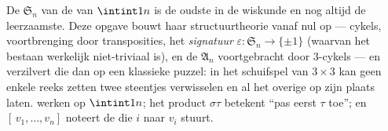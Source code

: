 \begin{problem}\label{pb:b1:structures:1}
De  $\mathfrak S_n$ van de  van $\intint1n$ is de oudste
 in de wiskunde en nog altijd de leerzaamste. Deze opgave bouwt haar
structuurtheorie vanaf nul op --- cykels, voortbrenging door
transposities, het  \emph{signatuur} $\varepsilon \colon
\mathfrak S_n \to \{\pm1\}$ (waarvan het bestaan werkelijk niet-triviaal
is), en de  $\mathfrak A_n$ voortgebracht door
$3$-cykels --- en verzilvert die dan op een klassieke puzzel: in het
schuifspel van $3 \times 3$ kan geen enkele reeks zetten twee steentjes
verwisselen en al het overige op zijn plaats laten.
 werken op $\intint1n$; het product $\sigma\tau$ betekent
``pas eerst $\tau$ toe''; en $[\,v_1, \dots, v_n]$ noteert de 
die $i$ naar $v_i$ stuurt.


\end{problem}
